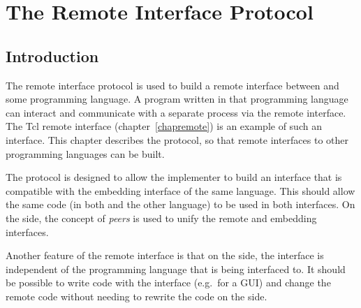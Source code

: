 %
% 
% 
% 
% 
%
%
%
\chapter{The Remote Interface Protocol}
\label{chapremoteproto}

\section{Introduction}

The {\eclipse} remote interface protocol is used to build a remote
interface between {\eclipse} and some programming language. A program
written in that programming language can interact and communicate with a
separate {\eclipse} process via the remote interface. The Tcl remote
interface (chapter~\ref{chapremote}) is an example of such an
interface. This chapter describes the protocol, so that remote interfaces
to other programming languages can be built.

The protocol is designed to allow the implementer to build an interface
that is compatible with the embedding interface of the same language. This
should allow the same code (in both {\eclipse} and the other language) to
be used in both interfaces. On the {\eclipse} side, the concept of {\it
peers\/} is used to unify the remote and embedding interfaces. 

Another feature of the remote interface is that on the {\eclipse} side,
the interface is independent of the programming language that is being
interfaced to. It should be possible to write {\eclipse} code with the
interface (e.g.\ for a GUI) and change the remote code without needing to
rewrite the code on the {\eclipse} side.

